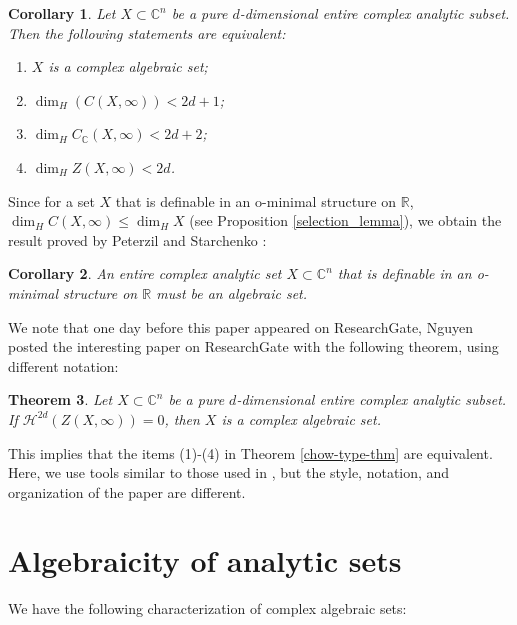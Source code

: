 \documentclass[a4paper,11pt]{amsart}
\newtheorem{theorem}{Theorem}[section]
\newtheorem{corollary}[theorem]{Corollary}
\newcommand{\C}{\mathbb C}
\begin{document}
\begin{corollary}
  Let $X\subset\C^n$ be a pure $d$-dimensional entire complex analytic subset. Then the following statements are equivalent:
\begin{enumerate}
 \item $X$ is a complex algebraic set;
 \item $\dim_{H}(C(X,\infty))<{2d+1}$;
 \item $\dim_{H} C_{\mathbb{C}}(X,\infty)<2d+2$;
 \item $\dim_{H} Z(X,\infty)<2d$.
\end{enumerate}  
\end{corollary}

Since for a set $X$ that is definable in an o-minimal structure on $\mathbb{R}$, $\dim_H C(X,\infty)\leq \dim_H X$ (see Proposition \ref{selection_lemma}), we obtain the result proved by Peterzil and Starchenko \cite{PeterzilS:2009}:
\begin{corollary}
An entire complex analytic set $X\subset \mathbb{C}^n$ that is definable in an o-minimal structure on $\mathbb{R}$ must be an algebraic set.
\end{corollary}

We note that one day before this paper appeared on ResearchGate, Nguyen posted the interesting paper \cite{Nguyen:2026} on ResearchGate with the following theorem, using different notation:
\begin{theorem}
Let $X\subset\C^n$ be a pure $d$-dimensional entire complex analytic subset. If $\mathcal{H}^{2d}(Z(X,\infty))=0$, then $X$ is a complex algebraic set.
\end{theorem}
This implies that the items (1)-(4) in Theorem \ref{chow-type-thm} are equivalent. Here, we use tools similar to those used in \cite{Nguyen:2026}, but the style, notation, and organization of the paper are different. 







\section{Algebraicity of analytic sets} 



We have the following characterization of complex algebraic sets:
\end{document}
